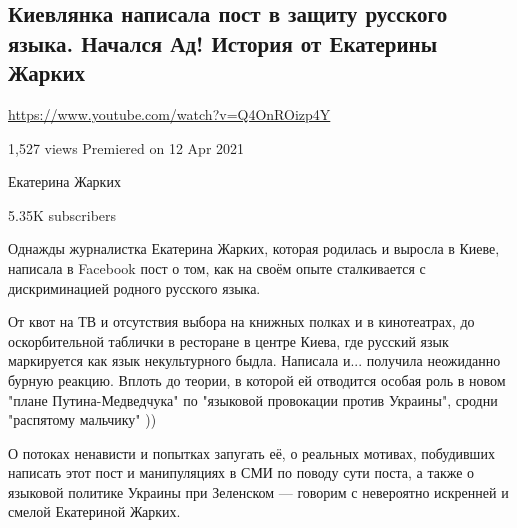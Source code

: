  
 
 
 
 
\subsection{Киевлянка написала пост в защиту русского языка. Начался Ад! История от Екатерины Жарких}
\label{sec:12_04_2021.youtube.zharkih_ekaterina.istoria_post_jazyk}

\url{https://www.youtube.com/watch?v=Q4OnROizp4Y}

1,527 views Premiered on 12 Apr 2021

Екатерина Жарких

5.35K subscribers

Однажды журналистка Екатерина Жарких, которая родилась и выросла в Киеве,
написала в Facebook пост о том, как на своём опыте сталкивается с
дискриминацией родного русского языка. 

От квот на ТВ и отсутствия выбора на книжных полках и в кинотеатрах, до
оскорбительной таблички в ресторане в центре Киева, где русский язык
маркируется как язык некультурного быдла. Написала и... получила неожиданно
бурную реакцию. Вплоть до теории, в которой ей отводится особая роль в новом
"плане Путина-Медведчука" по "языковой провокации против Украины", сродни
"распятому мальчику" ))

О потоках ненависти и попытках запугать её, о реальных мотивах, побудивших
написать этот пост и манипуляциях в СМИ по поводу сути поста, а также о
языковой политике Украины при Зеленском — говорим с невероятно искренней и
смелой Екатериной Жарких.




